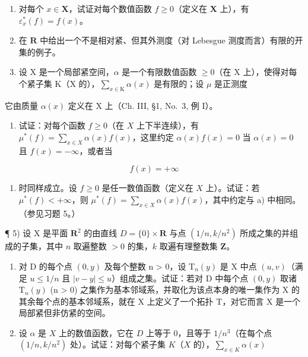 \begin{enumerate}
\def\labelenumi{\arabic{enumi})}
\setcounter{enumi}{1}
\item
  对每个 \(x \in \mathbf{X}\)，试证对每个数值函数 \(f \geqslant 0\)（定义在 \(\mathbf{X}\) 上），有 \(\varepsilon_x^*(f) = f(x)\)。
\item
  在 \(\mathbf{R}\) 中给出一个不是相对紧、但其外测度（对 Lebesgue 测度而言）有限的开集的例子。
\item
  设 \(\mathrm{X}\) 是一个局部紧空间，\(\alpha\) 是一个有限数值函数 \(\geqslant 0\)（在 \(\mathrm{X}\) 上），使得对每个紧子集 \(\mathrm{K}\)（\(\mathrm{X}\) 的），\(\sum_{x\in \mathrm{K}}\alpha (x)\) 是有限的；设 \(\mu\) 是正测度
\end{enumerate}

它由质量 \(\alpha(x)\) 定义在 X 上（Ch. III, §1, No.~3, 例 I）。

\begin{enumerate}
\def\labelenumi{\alph{enumi})}
\tightlist
\item
  试证：对每个函数 \(f \geqslant 0\)（在 \(X\) 上下半连续），有 \(\mu^{*}(f) = \sum_{x \in X} \alpha(x)f(x)\)，这里约定 \(\alpha(x)f(x) = 0\) 当 \(\alpha(x) = 0\) 且 \(f(x) = -\infty\)，或者当
\end{enumerate}

\[
f (x) = + \infty
\]

\begin{enumerate}
\def\labelenumi{\alph{enumi})}
\setcounter{enumi}{1}
\tightlist
\item
  时同样成立。设 \(f \geqslant 0\) 是任一数值函数（定义在 \(X\) 上）。试证：若 \(\mu^{*}(f) < +\infty\)，则 \(\mu^{*}(f) = \sum_{x \in X} \alpha(x)f(x)\)，其中约定与 a) 中相同。（参见习题 5。）
\end{enumerate}

¶ 5) 设 X 是平面 \(\mathbf{R}^2\) 的由直线 \(D = \{0\} \times \mathbf{R}\) 与点 \((1/n, k/n^2)\) 所成之集的并组成的子集，其中 \(n\) 取遍整数 \(>0\) 的集，\(k\) 取遍有理整数集 \(\mathbf{Z}\)。

\begin{enumerate}
\def\labelenumi{\alph{enumi})}
\item
  对 D 的每个点 \((0,y)\) 及每个整数 n \textgreater{} 0，设 \(\mathrm{T}_{n}(y)\) 是 X 中点 \((u,v)\)（满足 \(u \leqslant 1/n\) 且 \(|v - y| \leqslant u\)）组成之集。试证：若对 D 中每个点 \((0,y)\) 取诸 \(\mathrm{T}_{n}(y)\) (n \textgreater{} 0) 之集作为基本邻域系，并取化为该点本身的唯一集作为 X 的其余每个点的基本邻域系，就在 X 上定义了一个拓扑 T，对它而言 X 是一个局部紧但非仿紧的空间。
\item
  设 \(\alpha\) 是 \(X\) 上的数值函数，它在 \(D\) 上等于 0，且等于 \(1/n^3\)（在每个点 \((1/n, k/n^2)\) 处）。试证：对每个紧子集 \(K\)（\(X\) 的），\(\sum_{x \in K} \alpha(x)\)
\end{enumerate}

